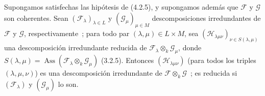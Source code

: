 \begin{proposition}[4.2.9]
\label{IV.2.4.2.9-fr}
Supongamos satisfechas las hipótesis de \textup{(4.2.5)}, y supongamos además que
$\mathcal F$ y $\mathcal G$ son coherentes. Sean
$(\mathcal F_\lambda)_{\lambda\in L}$ y
$(\mathcal G_\mu)_{\mu\in M}$ descomposiciones irredundantes de
$\mathcal F$ y $\mathcal G$, respectivamente~; para todo par
$(\lambda,\mu)\in L\times M$, sea
$(\mathcal H_{\lambda\mu\nu})_{\nu\in S(\lambda,\mu)}$ una descomposición
irredundante reducida de $\mathcal F_\lambda\otimes_k\mathcal G_\mu$, donde
$S(\lambda,\mu)=\operatorname{Ass}(\mathcal F_\lambda\otimes_k\mathcal G_\mu)$
\textup{(3.2.5)}. Entonces $(\mathcal H_{\lambda\mu\nu})$ \textup{(}para todos los triples
$(\lambda,\mu,\nu)$\textup{)} es una descomposición irredundante de
$\mathcal F\otimes_k\mathcal G$~; es reducida si
$(\mathcal F_\lambda)$ y $(\mathcal G_\mu)$ lo son.
\end{proposition}

